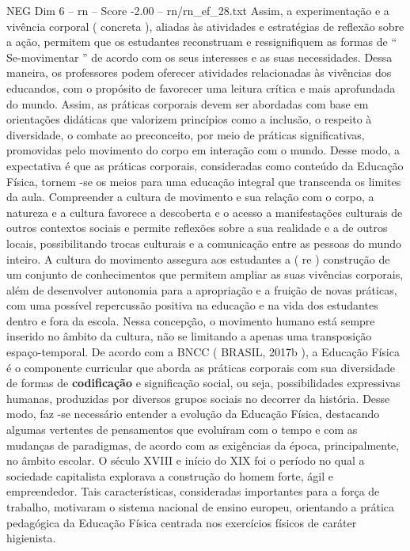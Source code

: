 \begin{textsample}{NEG Dim 6 – rn – Score -2.00 – rn/rn\_ef\_28.txt}
Assim, a experimentação e a vivência corporal ( concreta ), aliadas às atividades e estratégias de reflexão sobre a ação, permitem que os estudantes reconstruam e ressignifiquem as formas de “ Se-movimentar ” de acordo com os seus interesses e as suas necessidades.
Dessa maneira, os professores podem oferecer atividades relacionadas às vivências dos educandos, com o propósito de favorecer uma leitura crítica e mais aprofundada do mundo.
Assim, as práticas corporais devem ser abordadas com base em orientações didáticas que valorizem princípios como a inclusão, o respeito à diversidade, o combate ao preconceito, por meio de práticas significativas, promovidas pelo movimento do corpo em interação com o mundo.
Desse modo, a expectativa é que as práticas corporais, consideradas como conteúdo da Educação Física, tornem -se os meios para uma educação integral que transcenda os limites da aula.
Compreender a cultura de movimento e sua relação com o corpo, a natureza e a cultura favorece a descoberta e o acesso a manifestações culturais de outros contextos sociais e permite reflexões sobre a sua realidade e a de outros locais, possibilitando trocas culturais e a comunicação entre as pessoas do mundo inteiro.
A cultura do movimento assegura aos estudantes a ( re ) construção de um conjunto de conhecimentos que permitem ampliar as suas vivências corporais, além de desenvolver autonomia para a apropriação e a fruição de novas práticas, com uma possível repercussão positiva na educação e na vida dos estudantes dentro e fora da escola.
Nessa concepção, o movimento humano está sempre inserido no âmbito da cultura, não se limitando a apenas uma transposição espaço-temporal.
De acordo com a BNCC ( BRASIL, 2017b ), a Educação Física é o componente curricular que aborda as práticas corporais com sua diversidade de formas de \textbf{codificação} e significação social, ou seja, possibilidades expressivas humanas, produzidas por diversos grupos sociais no decorrer da história.
Desse modo, faz -se necessário entender a evolução da Educação Física, destacando algumas vertentes de pensamentos que evoluíram com o tempo e com as mudanças de paradigmas, de acordo com as exigências da época, principalmente, no âmbito escolar.
O século XVIII e início do XIX foi o período no qual a sociedade capitalista explorava a construção do homem forte, ágil e empreendedor.
Tais características, consideradas importantes para a força de trabalho, motivaram o sistema nacional de ensino europeu, orientando a prática pedagógica da Educação Física centrada nos exercícios físicos de caráter higienista.

\end{textsample}
